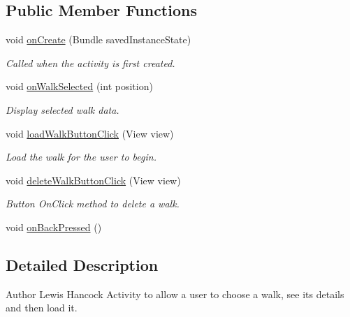 \subsection*{Public Member Functions}
\begin{DoxyCompactItemize}
\item 
void \hyperlink{classuk_1_1ac_1_1swan_1_1digitaltrails_1_1activities_1_1_choose_walk_activity_a00ea6871a055762d135f80e5e6d63ae8}{on\+Create} (Bundle saved\+Instance\+State)
\begin{DoxyCompactList}\small\item\em Called when the activity is first created. \end{DoxyCompactList}\item 
void \hyperlink{classuk_1_1ac_1_1swan_1_1digitaltrails_1_1activities_1_1_choose_walk_activity_a39ce270e37176e416954386fdd7ed814}{on\+Walk\+Selected} (int position)
\begin{DoxyCompactList}\small\item\em Display selected walk data. \end{DoxyCompactList}\item 
void \hyperlink{classuk_1_1ac_1_1swan_1_1digitaltrails_1_1activities_1_1_choose_walk_activity_a5a449af2d9903b35a7d581a55dcba6ad}{load\+Walk\+Button\+Click} (View view)
\begin{DoxyCompactList}\small\item\em Load the walk for the user to begin. \end{DoxyCompactList}\item 
void \hyperlink{classuk_1_1ac_1_1swan_1_1digitaltrails_1_1activities_1_1_choose_walk_activity_a9e72f5125238de5a590b38c712dab4c1}{delete\+Walk\+Button\+Click} (View view)
\begin{DoxyCompactList}\small\item\em Button On\+Click method to delete a walk. \end{DoxyCompactList}\item 
void \hyperlink{classuk_1_1ac_1_1swan_1_1digitaltrails_1_1activities_1_1_choose_walk_activity_aafe2b11ba8d328e7326f57745de81e7d}{on\+Back\+Pressed} ()
\end{DoxyCompactItemize}


\subsection{Detailed Description}
\begin{DoxyAuthor}{Author}
Lewis Hancock Activity to allow a user to choose a walk, see its details and then load it. 
\end{DoxyAuthor}


